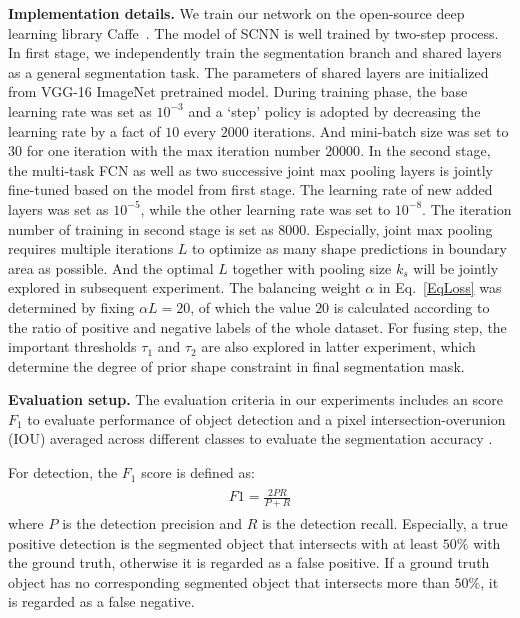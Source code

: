 \noindent\textbf{Implementation details.}
We train our network on the open-source deep learning library Caffe~\cite{Jia2014}.
The model of SCNN is well trained by two-step process.
In first stage, we independently train the segmentation branch and shared layers as a general segmentation task.
The parameters of shared layers are initialized from VGG-16 ImageNet pretrained model.
During training phase, the base learning rate was set as $10^{-3}$ and a `step' policy is adopted by decreasing the learning rate by a fact of $10$ every $2000$ iterations.
And mini-batch size was set to $30$ for one iteration with the max iteration number $20000$.
In the second stage, the multi-task FCN as well as two successive joint max pooling layers is jointly fine-tuned based on the model from first stage.
The learning rate of new added layers was set as $10^{-5}$, while the other learning rate was set to $10^{-8}$.
The iteration number of training in second stage is set as $8000$.
Especially, joint max pooling requires multiple iterations $L$ to optimize as many shape predictions in boundary area as possible.
And the optimal $L$ together with pooling size $k_s$ will be jointly explored in subsequent experiment.
The balancing weight $\alpha$ in Eq.~\ref{EqLoss} was determined by fixing $\alpha L=20$, of which the value $20$ is calculated according to the ratio of positive and negative labels of the whole dataset.
For fusing step, the important thresholds $\tau_1$ and $\tau_2$ are also explored in latter experiment, which determine the degree of prior shape constraint in final segmentation mask.

\noindent\textbf{Evaluation setup.}
%
The evaluation criteria in our experiments includes an score $F_1$ to evaluate performance of object detection and a pixel intersection-overunion (IOU) averaged across different classes to evaluate the segmentation accuracy .

For detection, the $F_1$ score is defined as:
%
\begin{eqnarray}\label{EqF1}
\begin{aligned}
F1 = \frac{2PR}{P+R}
\end{aligned}
\end{eqnarray}
where $P$ is the detection precision and $R$ is the detection recall.
Especially, a true positive detection is the segmented object that intersects with at least $50\%$ with the ground truth, otherwise it is regarded as a false positive.
If a ground truth object has no corresponding segmented object that intersects more than $50\%$, it is regarded as a false negative.

